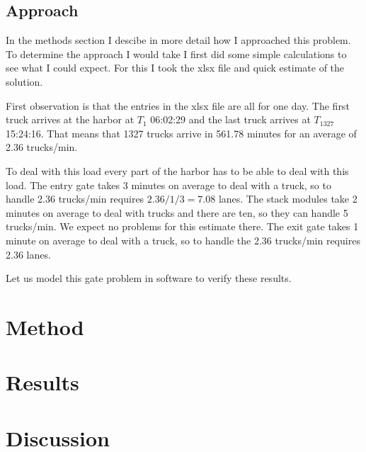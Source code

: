\documentclass{article}
\begin{document}
\subsection{Approach}

In the methods section I descibe in more detail how I approached this
problem. To determine the approach I would take I first did some
simple calculations to see what I could expect. For this I took the
xlsx file and quick estimate of the solution.

First observation is that the entries in the xlsx file are all for one
day. The first truck arrives at the harbor at $T_1$ 06:02:29 and the
last truck arrives at $T_{1327}$ 15:24:16. That means that 1327 trucks
arrive in 561.78 minutes for an average of 2.36 trucks/min.

To deal with this load every part of the harbor has to be able to deal
with this load. The entry gate takes 3 minutes on average to deal with
a truck, so to handle 2.36 trucks/min requires $2.36 / 1/3 = 7.08$
lanes. The stack modules take 2 minutes on average to deal with trucks
and there are ten, so they can handle 5 trucks/min. We expect no
problems for this estimate there. The exit gate takes 1 minute on
average to deal with a truck, so to handle the 2.36 trucks/min
requires 2.36 lanes.

Let us model this gate problem in software to verify these results.

\section{Method}
\section{Results}
\section{Discussion}
\end{document}
